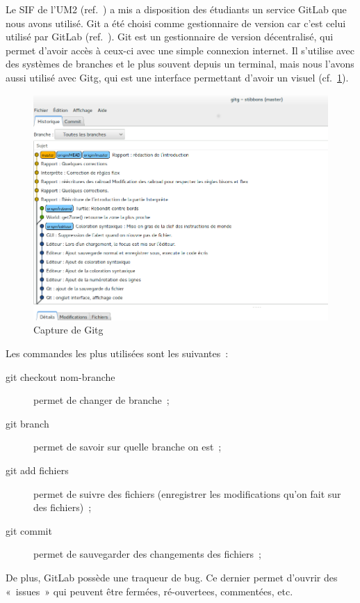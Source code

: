 Le SIF de l'UM2 (ref.~\cite{GitLabSIF}) a mis a disposition des étudiants un service GitLab que nous avons utilisé. Git a été choisi comme gestionnaire de version car c’est celui utilisé par GitLab (ref.~\cite{GitLab}).
Git est un gestionnaire de version décentralisé, qui permet d'avoir accès à ceux-ci avec une simple connexion internet.
Il s'utilise avec des systèmes de branches et le plus souvent depuis un terminal, mais nous l'avons aussi utilisé avec Gitg, qui est une interface permettant d'avoir un visuel (cf.~\ref{gitg}).

\begin{figure}[h]
\caption{\label{gitg} Capture de Gitg}
\includegraphics[scale=0.35]{doc/report/uml/gitbranche.png}
\end{figure}

Les commandes les plus utilisées sont les suivantes~:
\begin{description}
\item[git checkout nom-branche] permet de changer de branche~;
\item[git branch] permet de savoir sur quelle branche on est~;
\item[git add fichiers] permet de suivre des fichiers (enregistrer les modifications qu'on fait sur des fichiers)~;
\item[git commit] permet de sauvegarder des changements des fichiers~;
\end{description}

De plus, GitLab possède une traqueur de bug. Ce dernier permet d'ouvrir des «~issues~» qui peuvent être fermées, ré-ouvertees, commentées, etc.
